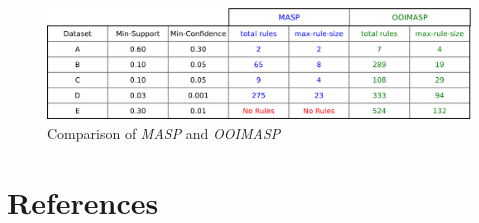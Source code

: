 \documentclass[5p, twocolumn]{elsarticle}
\begin{document}
\begin{figure}
\begin{center}
\includegraphics[scale=0.30]{pdf/comparison}
\end{center}
\caption{Comparison of \emph{MASP} and \emph{OOIMASP}}
\label{Fig 11}
\end{figure}

\section*{References}


\end{document}
